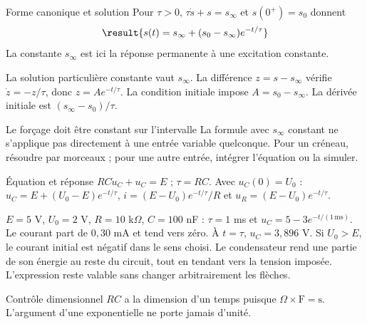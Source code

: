 \begin{loi}{Forme canonique et solution}
Pour $\tau>0$, $\tau\dot s+s=s_\infty$ et $s(0^+)=s_0$ donnent \[\result{s(t)=s_\infty+(s_0-s_\infty)e^{-t/\tau}}\] La constante $s_\infty$ est ici la réponse permanente à une excitation constante.
\end{loi}
La solution particulière constante vaut $s_\infty$. La différence $z=s-s_\infty$ vérifie $\dot z=-z/\tau$, donc $z=Ae^{-t/\tau}$. La condition initiale impose $A=s_0-s_\infty$. La dérivée initiale est $(s_\infty-s_0)/\tau$.
\begin{piege}{Le forçage doit être constant sur l’intervalle}
La formule avec $s_\infty$ constant ne s’applique pas directement à une entrée variable quelconque. Pour un créneau, résoudre par morceaux ; pour une autre entrée, intégrer l’équation ou la simuler.
\end{piege}


\begin{loi}{Équation et réponse}
$RC\dot u_C+u_C=E$ ; $\tau=RC$. Avec $u_C(0)=U_0$ : $u_C=E+(U_0-E)e^{-t/\tau}$, $i=(E-U_0)e^{-t/\tau}/R$ et $u_R=(E-U_0)e^{-t/\tau}$.
\end{loi}
$E=5$ V, $U_0=2$ V, $R=10$ k$\Omega$, $C=100$ nF : $\tau=1$ ms et $u_C=5-3e^{-t/(1\,\mathrm{ms})}$. Le courant part de $0{,}30$ mA et tend vers zéro. À $t=\tau$, $u_C=3{,}896$ V.
Si $U_0>E$, le courant initial est négatif dans le sens choisi. Le condensateur rend une partie de son énergie au reste du circuit, tout en tendant vers la tension imposée. L’expression reste valable sans changer arbitrairement les flèches.
\begin{methode}{Contrôle dimensionnel}
$RC$ a la dimension d’un temps puisque $\Omega\times\mathrm F=\mathrm s$. L’argument d’une exponentielle ne porte jamais d’unité.
\end{methode}


